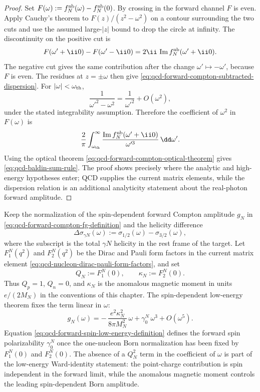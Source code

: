 \begin{proof}
Set \(F(\omega):=f_N^{\rm nb}(\omega)-f_N^{\rm nb}(0)\).  By crossing in the
forward channel \(F\) is even.  Apply Cauchy's theorem to
\(F(z)/(z^2-\omega^2)\) on a contour surrounding the two cuts and use the
assumed large-\(|z|\) bound to drop the circle at infinity.  The discontinuity
on the positive cut is
\[
  F(\omega'+\ii0)-F(\omega'-\ii0)
  =
  2\ii\,\operatorname{Im}f_N^{\rm nb}(\omega'+\ii0).
\]
The negative cut gives the same contribution after the change
\(\omega'\mapsto-\omega'\), because \(F\) is even.  The residues at
\(z=\pm\omega\) then give
\eqref{eq:qcd-forward-compton-subtracted-dispersion}.  For
\(|\omega|<\omega_{\rm th}\),
\[
  \frac{1}{\omega'^2-\omega^2}
  =
  \frac{1}{\omega'^2}
  +O(\omega^2),
\]
under the stated integrability assumption.  Therefore the coefficient of
\(\omega^2\) in \(F(\omega)\) is
\[
  \frac{2}{\pi}
  \int_{\omega_{\rm th}}^\infty
  \frac{\operatorname{Im}f_N^{\rm nb}(\omega'+\ii0)}{\omega'^3}\,\dd\omega' .
\]
Using the optical theorem
\eqref{eq:qcd-forward-compton-optical-theorem} gives
\eqref{eq:qcd-baldin-sum-rule}.  The proof shows precisely where the analytic
and high-energy hypotheses enter; QCD supplies the current matrix elements,
while the dispersion relation is an additional analyticity statement about the
real-photon forward amplitude.
\end{proof}

\begin{definition}
\label{def:qcd-forward-spin-polarizabilities}
Keep the normalization of the spin-dependent forward Compton amplitude
\(g_N\) in \eqref{eq:qcd-forward-compton-fg-definition} and the helicity
difference
\[
  \Delta\sigma_{\gamma N}(\omega)
  :=
  \sigma_{1/2}(\omega)-\sigma_{3/2}(\omega),
\]
where the subscript is the total \(\gamma N\) helicity in the rest frame of
the target.  Let \(F_1^N(q^2)\) and \(F_2^N(q^2)\) be the Dirac and Pauli form
factors in the current matrix element
\eqref{eq:qcd-nucleon-dirac-pauli-form-factors}, and set
\[
  Q_N:=F_1^N(0),\qquad
  \kappa_N:=F_2^N(0).
\]
Thus \(Q_p=1\), \(Q_n=0\), and \(\kappa_N\) is the anomalous magnetic moment
in units \(e/(2M_N)\) in the conventions of this chapter.  The
spin-dependent low-energy theorem fixes the term linear in \(\omega\):
\begin{equation}
  g_N(\omega)
  =
  -\,\frac{e^2\kappa_N^2}{8\pi M_N^2}\,\omega
  +\gamma_0^N\,\omega^3
  +O(\omega^5).
  \label{eq:qcd-forward-spin-low-energy-definition}
\end{equation}
Equation \eqref{eq:qcd-forward-spin-low-energy-definition} defines the
forward spin polarizability \(\gamma_0^N\) once the one-nucleon Born
normalization has been fixed by \(F_1^N(0)\) and \(F_2^N(0)\).  The absence of
a \(Q_N^2\) term in the coefficient of \(\omega\) is part of the low-energy
Ward-identity statement: the point-charge contribution is spin independent in
the forward limit, while the anomalous magnetic moment controls the leading
spin-dependent Born amplitude.
\end{definition}

